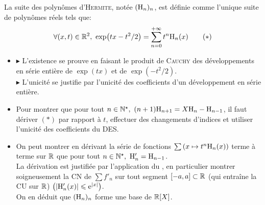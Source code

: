 \begin{defi}
    La suite des polynômes d'\textsc{Hermite}, notée $(\mathrm{H}_n)_n$, est définie comme l'unique suite de polynômes réels tels que:
    $$\forall(x, t) \in \mathbb{R}^2,\ \exp(tx-t^2/2) = \sum_{n=0}^{+\infty} t^n \mathrm{H}_n(x) \qquad (*)$$
\end{defi}

\begin{preuve}
    \begin{itemize}
    \item $\blacktriangleright$ L'existence se prouve en faisant le produit de \textsc{Cauchy} des développements en série entière de $\exp(tx)$ et de $\exp(-t^2/2)$.\\
    $\blacktriangleright$ L'unicité se justifie par l'unicité des coefficients d'un développement en série entière. 
    \item Pour montrer que pour tout $n \in \Ne,\ (n+1)\Hermite_{n+1}=X\Hermite_n-\Hermite_{n-1}$, il faut dériver $(*)$ par rapport à $t$, effectuer des changements d'indices et utiliser l'unicité des coefficients du DES. 
    \item On peut montrer en dérivant  la série de fonctions $\sum \left(x \mapsto t^n \mathrm{H}_n(x) \right)$ terme à terme sur $\mathbb{R}$ que pour tout $n \in \Ne,\ \Hermite'_n=\Hermite_{n-1}$.\\
    La dérivation est justifiée par l'application du , en particulier montrer soigneusement la CN de $\sum f'_n$ sur tout segment $[-a, a] \subset \mathbb{R}$ (qui entraîne la CU sur $\mathbb{R}$) $\left(|\mathrm{H}'_n(x)| \leqslant \mathrm{e}^{|x|} \right)$.\\
    On en déduit que $(\mathrm{H}_n)_n$ forme une base de $\mathbb{R}[X]$.\\
    \end{itemize}
\end{preuve}
